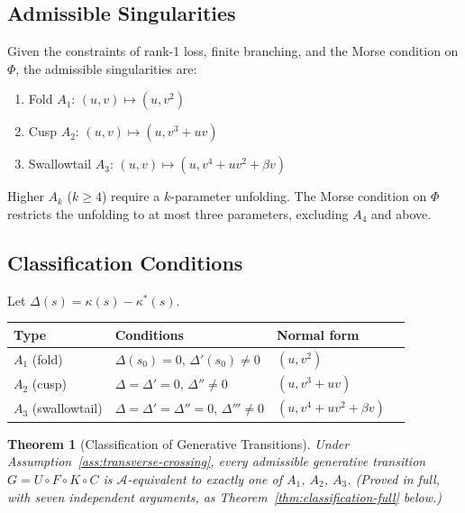 \documentclass[14pt,a4paper]{extarticle}
\newtheorem{theorem}{Theorem}[section]
\begin{document}
\subsection{Admissible Singularities}

Given the constraints of rank-1 loss, finite branching, and the Morse
condition on $\Phi$, the admissible singularities are:
\begin{enumerate}[leftmargin=2em]
  \item Fold $A_1$: $(u,v) \mapsto (u, v^2)$
  \item Cusp $A_2$: $(u,v) \mapsto (u, v^3 + uv)$
  \item Swallowtail $A_3$: $(u,v) \mapsto (u, v^4 + uv^2 + \beta v)$
\end{enumerate}
Higher $A_k$ ($k \geq 4$) require a $k$-parameter unfolding.
The Morse condition on $\Phi$ restricts the unfolding to at most three
parameters, excluding $A_4$ and above.

\subsection{Classification Conditions}

Let $\Delta(s) = \kappa(s) - \kappa^*(s)$.

\begin{center}
\small
\begin{tabular}{llll}
\toprule
Type & Conditions & Normal form \\
\midrule
$A_1$ (fold)        & $\Delta(s_0)=0$, $\Delta'(s_0)\neq 0$
                    & $(u, v^2)$ \\
$A_2$ (cusp)        & $\Delta=\Delta'=0$, $\Delta''\neq 0$
                    & $(u, v^3+uv)$ \\
$A_3$ (swallowtail) & $\Delta=\Delta'=\Delta''=0$, $\Delta'''\neq 0$
                    & $(u, v^4+uv^2+\beta v)$ \\
\bottomrule
\end{tabular}
\end{center}

\begin{theorem}[Classification of Generative Transitions]
\label{thm:classification}
Under Assumption~\ref{ass:transverse-crossing}, every admissible
generative transition $G = U \circ F \circ K \circ C$
is $\mathcal{A}$-equivalent to exactly one of $A_1$, $A_2$, $A_3$.
(Proved in full, with seven independent arguments, as
Theorem~\ref{thm:classification-full} below.)
\end{theorem}
\end{document}

